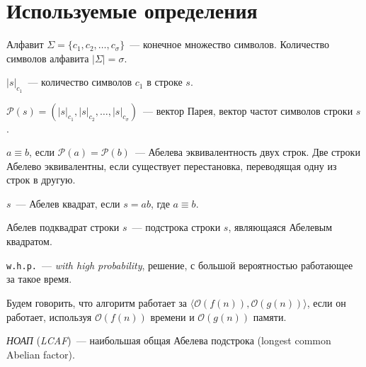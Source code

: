 \section{Используемые определения}

\begin{definition}
Алфавит $\Sigma=\{c_1, c_2, \ldots, c_\sigma\}$~--- конечное множество символов. Количество символов алфавита $|\Sigma|=\sigma$.
\end{definition}

\begin{definition}
$|s|_{c_1}$~--- количество символов $c_1$ в строке $s$.
\end{definition}


\begin{definition}
$\mathcal{P}(s)=(|s|_{c_1}, |s|_{c_2}, \ldots, |s|_{c_\sigma})$~--- вектор Парея, вектор частот символов строки $s$.
\end{definition}

\begin{definition}
$a \equiv b$, если $\mathcal{P}(a) = \mathcal{P}(b)$~--- Абелева эквивалентность двух строк. Две строки Абелево эквивалентны, если существует перестановка, переводящая одну из строк в другую.
\end{definition}

\begin{definition}
$s$~--- Абелев квадрат, если $s=ab$, где $a \equiv b$.
\end{definition}

\begin{definition}
Абелев подквадрат строки $s$~--- подстрока строки $s$, являющаяся Абелевым квадратом.
\end{definition}

\begin{definition}
\texttt{w.h.p.}~--- \textit{with high probability}, решение, с большой вероятностью работающее за такое время.
\end{definition}

\begin{definition}
Будем говорить, что алгоритм работает за $\langle \mathcal{O}(f(n)), \mathcal{O}(g(n)) \rangle$, если он работает, используя $\mathcal{O}(f(n))$ времени и  $\mathcal{O}(g(n))$ памяти.
\end{definition}

\begin{definition}
\textit{НОАП} (\textit{LCAF})~--- наибольшая общая Абелева подстрока (longest common Abelian factor).
\end{definition}

